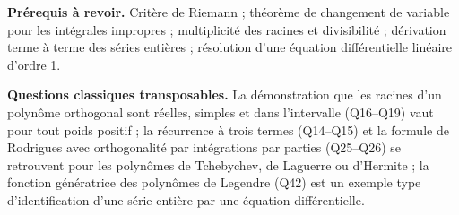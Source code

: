 \documentclass[11pt,a4paper]{article}
\begin{document}
\textbf{Prérequis à revoir.} Critère de Riemann ; théorème de changement de variable pour les intégrales impropres ; multiplicité des racines et divisibilité ; dérivation terme à terme des séries entières ; résolution d'une équation différentielle linéaire d'ordre 1.

\textbf{Questions classiques transposables.} La démonstration que les racines d'un polynôme orthogonal sont réelles, simples et dans l'intervalle (Q16--Q19) vaut pour tout poids positif ; la récurrence à trois termes (Q14--Q15) et la formule de Rodrigues avec orthogonalité par intégrations par parties (Q25--Q26) se retrouvent pour les polynômes de Tchebychev, de Laguerre ou d'Hermite ; la fonction génératrice des polynômes de Legendre (Q42) est un exemple type d'identification d'une série entière par une équation différentielle.
\end{document}
